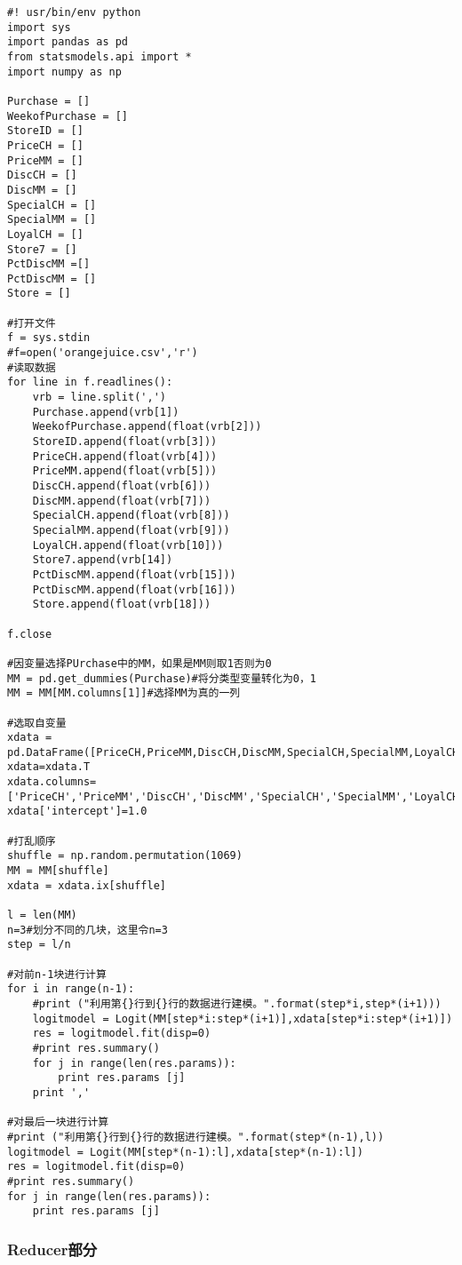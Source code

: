 \begin{lstlisting}
#! usr/bin/env python
import sys
import pandas as pd
from statsmodels.api import *
import numpy as np

Purchase = []
WeekofPurchase = []
StoreID = []
PriceCH = []
PriceMM = []
DiscCH = []
DiscMM = []
SpecialCH = []
SpecialMM = []
LoyalCH = []
Store7 = []
PctDiscMM =[]
PctDiscMM = []
Store = []

#打开文件
f = sys.stdin
#f=open('orangejuice.csv','r')
#读取数据
for line in f.readlines():
    vrb = line.split(',')
    Purchase.append(vrb[1])
    WeekofPurchase.append(float(vrb[2]))
    StoreID.append(float(vrb[3]))
    PriceCH.append(float(vrb[4]))
    PriceMM.append(float(vrb[5]))
    DiscCH.append(float(vrb[6]))
    DiscMM.append(float(vrb[7]))
    SpecialCH.append(float(vrb[8]))
    SpecialMM.append(float(vrb[9]))
    LoyalCH.append(float(vrb[10]))
    Store7.append(vrb[14])
    PctDiscMM.append(float(vrb[15]))
    PctDiscMM.append(float(vrb[16]))
    Store.append(float(vrb[18]))

f.close

#因变量选择PUrchase中的MM，如果是MM则取1否则为0
MM = pd.get_dummies(Purchase)#将分类型变量转化为0，1
MM = MM[MM.columns[1]]#选择MM为真的一列

#选取自变量
xdata = pd.DataFrame([PriceCH,PriceMM,DiscCH,DiscMM,SpecialCH,SpecialMM,LoyalCH])
xdata=xdata.T
xdata.columns=['PriceCH','PriceMM','DiscCH','DiscMM','SpecialCH','SpecialMM','LoyalCH']
xdata['intercept']=1.0

#打乱顺序
shuffle = np.random.permutation(1069)
MM = MM[shuffle]
xdata = xdata.ix[shuffle]

l = len(MM)
n=3#划分不同的几块，这里令n=3
step = l/n

#对前n-1块进行计算
for i in range(n-1):
    #print ("利用第{}行到{}行的数据进行建模。".format(step*i,step*(i+1)))
    logitmodel = Logit(MM[step*i:step*(i+1)],xdata[step*i:step*(i+1)])
    res = logitmodel.fit(disp=0)
    #print res.summary()
    for j in range(len(res.params)):
        print res.params [j]
    print ','

#对最后一块进行计算
#print ("利用第{}行到{}行的数据进行建模。".format(step*(n-1),l))
logitmodel = Logit(MM[step*(n-1):l],xdata[step*(n-1):l])
res = logitmodel.fit(disp=0)
#print res.summary()
for j in range(len(res.params)):
    print res.params [j]
\end{lstlisting}

\subsubsection{Reducer部分}\label{reducerux90e8ux5206}

